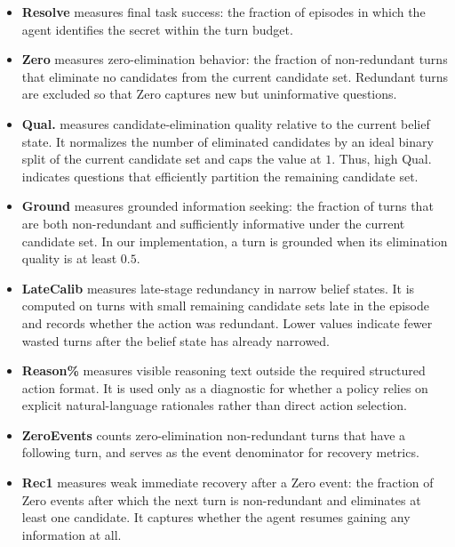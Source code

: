 \documentclass[11pt]{article}
\theoremstyle{plain}
\theoremstyle{definition}
\theoremstyle{remark}
\begin{document}
\begin{itemize}
    \item \textbf{Resolve} measures final task success: the fraction of episodes in which the agent identifies the secret within the turn budget.

    \item \textbf{Zero} measures zero-elimination behavior: the fraction of non-redundant turns that eliminate no candidates from the current candidate set. Redundant turns are excluded so that Zero captures new but uninformative questions.

    \item \textbf{Qual.} measures candidate-elimination quality relative to the current belief state. It normalizes the number of eliminated candidates by an ideal binary split of the current candidate set and caps the value at \(1\). Thus, high Qual. indicates questions that efficiently partition the remaining candidate set.

    \item \textbf{Ground} measures grounded information seeking: the fraction of turns that are both non-redundant and sufficiently informative under the current candidate set. In our implementation, a turn is grounded when its elimination quality is at least \(0.5\).

    \item \textbf{LateCalib} measures late-stage redundancy in narrow belief states. It is computed on turns with small remaining candidate sets late in the episode and records whether the action was redundant. Lower values indicate fewer wasted turns after the belief state has already narrowed.

    \item \textbf{Reason\%} measures visible reasoning text outside the required structured action format. It is used only as a diagnostic for whether a policy relies on explicit natural-language rationales rather than direct action selection.

    \item \textbf{ZeroEvents} counts zero-elimination non-redundant turns that have a following turn, and serves as the event denominator for recovery metrics.
 
\item \textbf{Rec1} measures weak immediate recovery after a Zero event: the fraction of Zero events after which the next turn is non-redundant and eliminates at least one candidate. It captures whether the agent resumes gaining any information at all.


\end{itemize}
\end{document}

